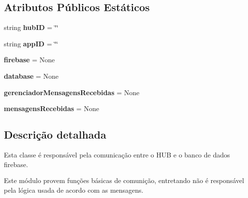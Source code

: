 \subsection*{Atributos Públicos Estáticos}
\begin{DoxyCompactItemize}
\item 
string {\bfseries hub\+ID} = \char`\"{}\char`\"{}\hypertarget{classhub_para_firebase_1_1_hub_para_firebase_a877a7af6deac7745ca493313cc812936}{}\label{classhub_para_firebase_1_1_hub_para_firebase_a877a7af6deac7745ca493313cc812936}

\item 
string {\bfseries app\+ID} = \char`\"{}\char`\"{}\hypertarget{classhub_para_firebase_1_1_hub_para_firebase_a1151963c2e4dea5ea944b2082a629a07}{}\label{classhub_para_firebase_1_1_hub_para_firebase_a1151963c2e4dea5ea944b2082a629a07}

\item 
{\bfseries firebase} = None\hypertarget{classhub_para_firebase_1_1_hub_para_firebase_aaa1bce183719a2446b9b697db2ccb45a}{}\label{classhub_para_firebase_1_1_hub_para_firebase_aaa1bce183719a2446b9b697db2ccb45a}

\item 
{\bfseries database} = None\hypertarget{classhub_para_firebase_1_1_hub_para_firebase_ad897e9d2142426f09b8154ae0e0ab374}{}\label{classhub_para_firebase_1_1_hub_para_firebase_ad897e9d2142426f09b8154ae0e0ab374}

\item 
{\bfseries gerenciador\+Mensagens\+Recebidas} = None\hypertarget{classhub_para_firebase_1_1_hub_para_firebase_ae5cbb5c32dda53f7f6a6c1b5685d2815}{}\label{classhub_para_firebase_1_1_hub_para_firebase_ae5cbb5c32dda53f7f6a6c1b5685d2815}

\item 
{\bfseries mensagens\+Recebidas} = None\hypertarget{classhub_para_firebase_1_1_hub_para_firebase_aed56c55b4e098c7c77ffee2759801901}{}\label{classhub_para_firebase_1_1_hub_para_firebase_aed56c55b4e098c7c77ffee2759801901}

\end{DoxyCompactItemize}


\subsection{Descrição detalhada}
Esta classe é responsável pela comunicação entre o H\+UB e o banco de dados firebase. 

Este módulo provem funções básicas de comunição, entretando não é responsável pela lógica usada de acordo com as mensagens.


